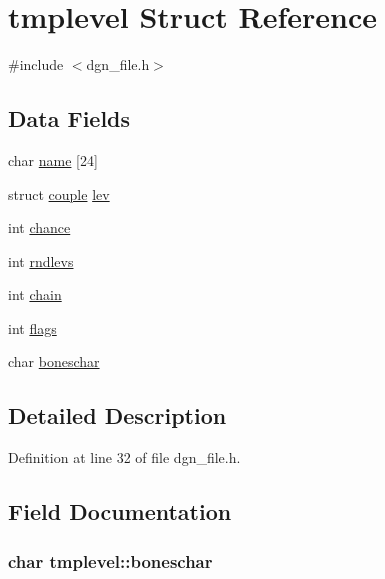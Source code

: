 \hypertarget{structtmplevel}{\section{tmplevel Struct Reference}
\label{structtmplevel}
}


{\ttfamily \#include $<$dgn\+\_\+file.\+h$>$}

\subsection*{Data Fields}
\begin{DoxyCompactItemize}
\item 
char \hyperlink{structtmplevel_aa6d82e41034f868e4faecb13894a9678}{name} \mbox{[}24\mbox{]}
\item 
struct \hyperlink{structcouple}{couple} \hyperlink{structtmplevel_ada09b88c0767640ed669ca3c33d4596c}{lev}
\item 
int \hyperlink{structtmplevel_a89b2e83769e060ae5eff2e53d05d5985}{chance}
\item 
int \hyperlink{structtmplevel_ae2bb5a646ad20b755997afbab6c5d4c7}{rndlevs}
\item 
int \hyperlink{structtmplevel_a8efe919a644ce455b48622cca29a0cf9}{chain}
\item 
int \hyperlink{structtmplevel_a29a97121ae74a7520c9580a595a85622}{flags}
\item 
char \hyperlink{structtmplevel_af6b0821a944c4d262aeb8c137d77e246}{boneschar}
\end{DoxyCompactItemize}


\subsection{Detailed Description}


Definition at line 32 of file dgn\+\_\+file.\+h.



\subsection{Field Documentation}
\hypertarget{structtmplevel_af6b0821a944c4d262aeb8c137d77e246}{
\subsubsection[{boneschar}]{\setlength{\rightskip}{0pt plus 5cm}char tmplevel\+::boneschar}}\label{structtmplevel_af6b0821a944c4d262aeb8c137d77e246}


